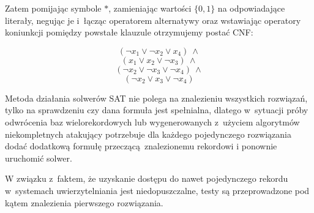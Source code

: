 Zatem pomijając symbole $*$, zamieniając wartości $\{0,1\}$ na odpowiadające literały, negując je i~łącząc operatorem alternatywy
oraz wstawiając operatory koniunkcji pomiędzy powstałe klauzule otrzymujemy postać CNF:

\[ (\neg x_1 \lor \neg x_2 \lor x_4)~\land \]\[  (x_1 \lor x_2 \lor \neg x_3)~\land \]\[ (\neg x_2 \lor \neg x_3 \lor \neg x_4)~\land \]\[(\neg x_2 \lor x_3 \lor \neg x_4) \]


Metoda działania solwerów SAT nie polega na znalezieniu wszystkich rozwiązań, tylko na sprawdzeniu czy dana formuła jest spełnialna, 
dlatego w~sytuacji próby odwrócenia baz wielorekordowych lub wygenerowanych z~użyciem algorytmów niekompletnych atakujący potrzebuje dla każdego pojedynczego rozwiązania dodać dodatkową formułę przeczącą znalezionemu rekordowi i ponownie uruchomić solwer.   

W związku z~faktem, że uzyskanie dostępu do nawet pojedynczego rekordu w~systemach uwierzytelniania jest niedopuszczalne, testy są przeprowadzone pod kątem znalezienia pierwszego rozwiązania. 
